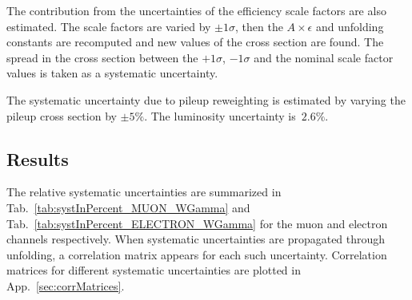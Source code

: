 
The contribution from the uncertainties of the efficiency scale factors are also estimated. The scale factors are varied by $\pm 1\sigma$, then the $A \times \epsilon$ and unfolding constants are recomputed and new values of the cross section are found. The spread in the cross section between the $+1\sigma$, $-1\sigma$ and the nominal scale factor values is taken as a systematic uncertainty.



The systematic uncertainty due to pileup reweighting is estimated by varying the pileup cross section by $\pm5\%$. The luminosity uncertainty is~$2.6\%$.

\subsection{Results}

The relative systematic uncertainties are summarized in Tab.~\ref{tab:systInPercent_MUON_WGamma} and Tab.~\ref{tab:systInPercent_ELECTRON_WGamma} for the muon and electron channels respectively. When systematic uncertainties are propagated through unfolding, a correlation matrix appears for each such uncertainty. Correlation matrices for different systematic uncertainties are plotted in App.~\ref{sec:corrMatrices}.

